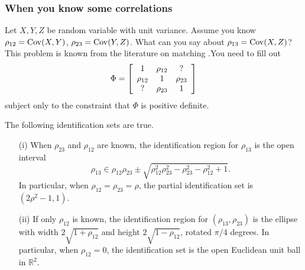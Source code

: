 \subsubsection{When you know some correlations}
Let $X,Y,Z$ be random variable with unit variance. Assume you know
$\rho_{12}=\operatorname{Cov}(X,Y)$, $\rho_{23}=\operatorname{Cov}(Y,Z)$. What can you say about
$\rho_{13}=\operatorname{Cov}(X,Z)$? This problem is known from the literature
on matching \parencite{Rassler2012-rp}.You need to fill out
\[
\Phi=\left[\begin{array}{ccc}
1 & \rho_{12} & ?\\
\rho_{12} & 1 & \rho_{23}\\
\text{\ensuremath{?}} & \rho_{23} & 1
\end{array}\right]
\]
subject only to the constraint that $\Phi$ is positive definite. 
\begin{proposition}
\label{prop:correlation identification}The following identification
sets are true.
\begin{itemize}
\item[(i)] When $\rho_{23}$ and $\rho_{12}$ are known, the identification region
for $\rho_{13}$ is the open interval
\begin{equation}
\rho_{13}\in\rho_{12}\rho_{23}\pm\sqrt{\rho_{12}^{2}\rho_{23}^{2}-\rho_{23}^{2}-\rho_{12}^{2}+1}.\label{eq:identification set correlation}
\end{equation}
In particular, when $\rho_{12}=\rho_{23}=\rho$, the partial identification
set is $(2\rho^{2}-1,1)$. 
\item[(ii)] If only $\rho_{12}$ is known, the identification region for $(\rho_{13},\rho_{23})$
is the ellipse with width $2\sqrt{1+\rho_{12}}$ and height $2\sqrt{1-\rho_{12}}$,
rotated $\pi/4$ degrees. In particular, when $\rho_{12}=0$, the
identification set is the open Euclidean unit ball in $\mathbb{R}^{2}$.
\end{itemize}
\end{proposition}

